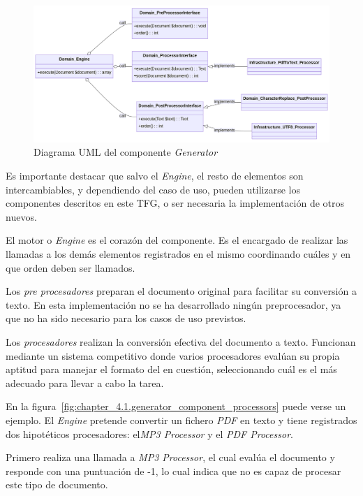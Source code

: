 \begin{figure}[ht]
    \begin{center}
        \includegraphics[width=\textwidth]{./chapter/4/images/chapter_4.1.generator_component_uml}
        \caption{Diagrama UML del componente \textit{Generator}}
        \label{fig:chapter_4.1.generator_component_uml}
    \end{center}
\end{figure}

Es importante destacar que salvo el \textit{Engine}, el resto de elementos son intercambiables, y dependiendo del caso
de uso, pueden utilizarse los componentes descritos en este TFG, o ser necesaria la implementación de otros nuevos.

El motor o \textit{Engine} es el corazón del componente.
Es el encargado de realizar las llamadas a los demás elementos registrados en el mismo coordinando cuáles y en que
orden deben ser llamados.

Los \textit{pre procesadores} preparan el documento original para facilitar su conversión a texto.
En esta implementación no se ha desarrollado ningún preprocesador, ya que no ha sido necesario para los casos de uso
previstos.

Los \textit{procesadores} realizan la conversión efectiva del documento a texto.
Funcionan mediante un sistema competitivo donde varios procesadores evalúan su propia aptitud para manejar el
formato del en cuestión, seleccionando cuál es el más adecuado para llevar a cabo la tarea.

En la figura~\ref{fig:chapter_4.1.generator_component_processors} puede verse un ejemplo.
El \textit{Engine} pretende convertir un fichero \textit{PDF} en texto y tiene registrados dos
hipotéticos procesadores: el\textit{MP3 Processor} y el \textit{PDF Processor}.

Primero realiza una llamada a \textit{MP3 Processor}, el cual evalúa el documento y responde con una puntuación
de -1, lo cual indica que no es capaz de procesar este tipo de documento.

